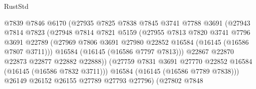 \begin{lexlean}{RustStd}
\begin{coremodule}
                                  @7839
                                  @7846
                                  @6170
                                  (@27935
                                    @7825
                                    @7838
                                    @7845
                                    @3741
                                    @7788
                                    @3691
                                    (@27943
                                      @7814
                                      @7823
                                      (@27948
                                        @7814
                                        @7821
                                        @5159
                                        (@27955
                                          @7813
                                          @7820
                                          @3741
                                          @7796
                                          @3691
                                          @22789
                                          (@27969
                                            @7806
                                            @3691
                                            @27980
                                            @22852
                                            @16584
                                            (@16145 (@16586 @7807 @3711)))
                                          @16584
                                          (@16145 (@16586 @7797 @7813)))
                                        @22867
                                        @22870
                                        @22873
                                        @22877
                                        @22882
                                        @22888))
                                    (@27759
                                      @7831
                                      @3691
                                      @27770
                                      @22852
                                      @16584
                                      (@16145 (@16586 @7832 @3711)))
                                    @16584
                                    (@16145 (@16586 @7789 @7838)))
                                  @26149
                                  @26152
                                  @26155
                                  @27789
                                  @27793
                                  @27796)
                                (@27802
                                  @7848

\end{coremodule}
\end{lexlean}
